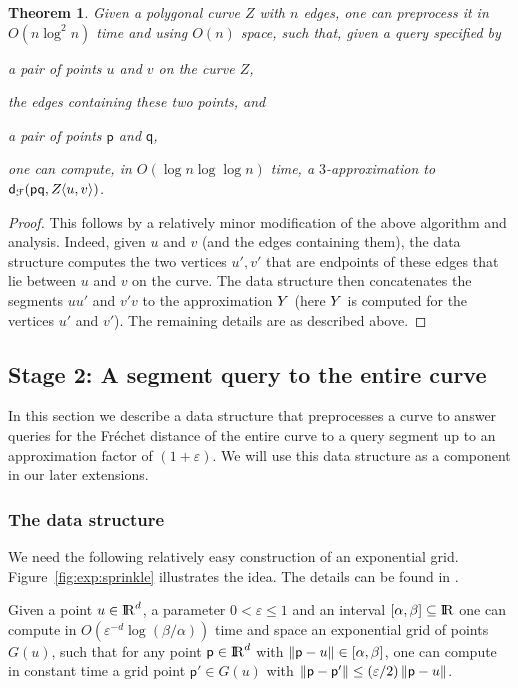 \documentclass[12pt]{article}
\newtheorem{theorem}{Theorem}[section]
\newcommand{\seclab}[1]{\label{sec:#1}}
\newcommand{\thmlab}[1]{{\label{theo:#1}}}
\newcommand{\lemlab}[1]{\label{lemma:#1}}
\newcommand{\figref}[1]{Figure~\ref{fig:#1}}
\newcommand{\ts}{\hspace{0.6pt}}
\newcommand{\Frechet}{Fr\'{e}c{h}e{}t\xspace}\providecommand{\Arr}{\mathop{\mathrm{\EuScript{A}}}}
\newcommand{\distFr}[2]{\mathsf{d}_{\EuScript{F}}\pth{#1, #2}}
\newcommand{\distX}[2]{\distCmd{#1 - #2}}
\newcommand{\pnt}{\mathsf{p}}
\newcommand{\pntA}{\mathsf{q}}
\newcommand{\SimplifyX}[1]{#1}
\newcommand{\cZ}{{Z}}
\newcommand{\cY}{\SimplifyX{\cYBase}}
\providecommand{\pth}[2][\!]{#1\left({#2}\right)}
\providecommand{\eps}{{\varepsilon}}\renewcommand{\Re}{{\rm I\!\hspace{-0.025em} R}}
\newcommand{\SC}[3]{{#1}\!\!\ts\ts \left\langle  #2, #3 \right\rangle}
\numberwithin{figure}{section}
\numberwithin{equation}{section}
\begin{document}
\begin{theorem}\thmlab{data:structure:constant}Given a polygonal curve $\cZ$ with $n$ edges, one can preprocess
    it in $O(n \log^2 n)$ time and using $O(n)$ space, such that,
    given a query specified by
    \begin{compactenum}[\quad(i)]
        \item a pair of points $u$ and $v$ on the curve $\cZ$,
        \item the edges containing these two points, and
        \item a pair of points $\pnt$ and $\pntA$,
    \end{compactenum}
    one can compute, in $O( \log n \log \log n)$ time, a
    $3$-approximation to $\distFr{\pnt \pntA} {\SC{\cZ}{u}{v}}$.
\end{theorem}

\begin{proof}
    This follows by a relatively minor modification of the above
    algorithm and analysis. Indeed, given $u$ and $v$ (and the edges
    containing them), the data structure computes the two vertices
    $u', v'$ that are endpoints of these edges that lie between $u$
    and $v$ on the curve. The data structure then concatenates the
    segments $u{} u'$ and $v'{} v$ to the approximation $\cY$ (here
    $\cY$ is computed for the vertices $u'$ and $v'$).  The remaining
    details are as described above.
\end{proof}


\subsection{Stage 2: A segment query to the entire curve}
\seclab{queries:stage:two}

In this section we describe a data structure that preprocesses a curve
to answer queries for the \Frechet distance of the entire curve to a
query segment up to an approximation factor of $(1+\eps)$. We will use
this data structure as a component in our later extensions.



\subsubsection{The data structure}

We need the following relatively easy construction of an exponential
grid. \figref{exp:sprinkle} illustrates the idea.
The details can be found in \cite{d-raapg-13}. 
\begin{lemma}\lemlab{exp:grid}
    Given a point $u \in \Re^d$, a parameter $0<\eps\leq 1$ and an interval
    $[\alpha,\beta] \subseteq \Re$ one can compute in $O\pth{\eps^{-d}
    \log\pth{\beta/\alpha}}$ time and space an exponential grid of points $G(u)$, 
    such that for any point $\pnt \in \Re^d$ with $\distX{\pnt}{u} \in
    [\alpha,\beta]$,
    one can compute in constant time a grid point $\pnt' \in G(u)$ with 
    $\distX{\pnt}{\pnt'} \leq (\eps/2) \distX{\pnt}{u}$.
\end{lemma}
\end{document}
